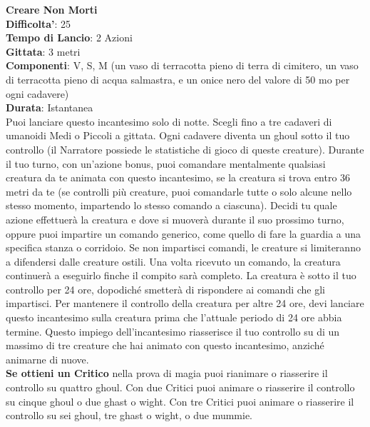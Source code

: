 \begin{multicols}{2}
\medskip\textbf{Creare Non Morti}\\
\textbf{Difficolta'}: 25\\
\textbf{Tempo di Lancio}: 2 Azioni\\
\textbf{Gittata}: 3 metri\\
\textbf{Componenti}: V, S, M (un vaso di terracotta pieno di terra di cimitero, un vaso di terracotta pieno di acqua salmastra, e un onice nero del valore di 50 mo per ogni cadavere)\\
\textbf{Durata}: Istantanea\\
Puoi lanciare questo incantesimo solo di notte. Scegli fino a tre cadaveri di umanoidi Medi o Piccoli a gittata. Ogni cadavere diventa un ghoul sotto il tuo controllo (il Narratore possiede le statistiche di gioco di queste creature). Durante il tuo turno, con un’azione bonus, puoi comandare mentalmente qualsiasi creatura da te animata con questo incantesimo, se la creatura si trova entro 36 metri da te (se controlli più creature, puoi comandarle tutte o solo alcune nello stesso momento, impartendo lo stesso comando a ciascuna). Decidi tu quale azione effettuerà la creatura e dove si muoverà durante il suo prossimo turno, oppure puoi impartire un comando generico, come quello di fare la guardia a una specifica stanza o corridoio. Se non impartisci comandi, le creature si limiteranno a difendersi dalle creature ostili. Una volta ricevuto un comando, la creatura continuerà a eseguirlo finche il compito sarà completo. La creatura è sotto il tuo controllo per 24 ore, dopodiché smetterà di rispondere ai comandi che gli impartisci. Per mantenere il controllo della creatura per altre 24 ore, devi lanciare questo incantesimo sulla creatura prima che l’attuale periodo di 24 ore abbia termine. Questo impiego dell’incantesimo riasserisce il tuo controllo su di un massimo di tre creature che hai animato con questo incantesimo, anziché animarne di nuove.\\
\textbf{Se ottieni un Critico} nella prova di magia puoi rianimare o riasserire il controllo su quattro ghoul. Con due Critici puoi animare o riasserire il controllo su cinque
ghoul o due ghast o wight. Con tre Critici puoi animare o riasserire il controllo su sei ghoul, tre ghast o wight, o due mummie. 


\end{multicols}
